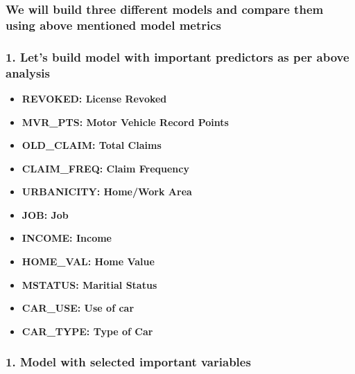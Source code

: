 \documentclass[]{article}
\providecommand{\tightlist}{%
  \setlength{\itemsep}{0pt}\setlength{\parskip}{0pt}}
\begin{document}
\hypertarget{we-will-build-three-different-models-and-compare-them-using-above-mentioned-model-metrics}{%
\subsubsection{\texorpdfstring{\textbf{We will build three different
models and compare them using above mentioned model
metrics}}{We will build three different models and compare them using above mentioned model metrics}}\label{we-will-build-three-different-models-and-compare-them-using-above-mentioned-model-metrics}}

\hypertarget{lets-build-model-with-important-predictors-as-per-above-analysis}{%
\subsubsection{\texorpdfstring{\textbf{1. Let's build model with
important predictors as per above
analysis}}{1. Let's build model with important predictors as per above analysis}}\label{lets-build-model-with-important-predictors-as-per-above-analysis}}

\begin{itemize}
\tightlist
\item
  \textbf{REVOKED: License Revoked}
\item
  \textbf{MVR\_PTS: Motor Vehicle Record Points}
\item
  \textbf{OLD\_CLAIM: Total Claims}
\item
  \textbf{CLAIM\_FREQ: Claim Frequency}
\item
  \textbf{URBANICITY: Home/Work Area}
\item
  \textbf{JOB: Job}
\item
  \textbf{INCOME: Income}
\item
  \textbf{HOME\_VAL: Home Value}
\item
  \textbf{MSTATUS: Maritial Status}
\item
  \textbf{CAR\_USE: Use of car}
\item
  \textbf{CAR\_TYPE: Type of Car}
\end{itemize}

\hypertarget{model-with-selected-important-variables}{%
\subsubsection{\texorpdfstring{\textbf{1. Model with selected important
variables}}{1. Model with selected important variables}}\label{model-with-selected-important-variables}}
\end{document}
